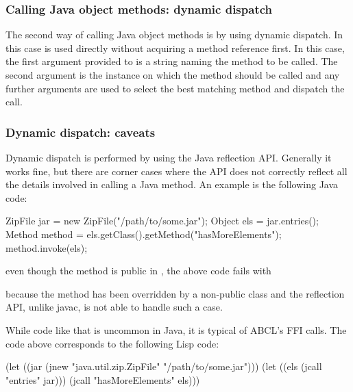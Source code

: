 \documentclass[10pt]{book}
\begin{document}
\subsubsection{Calling Java object methods: dynamic dispatch}

The second way of calling Java object methods is by using dynamic dispatch.
In this case  is used directly without acquiring a method
reference first. In this case, the first argument provided to 
is a string naming the method to be called. The second argument is the instance
on which the method should be called and any further arguments are used to
select the best matching method and dispatch the call.

\subsubsection{Dynamic dispatch: caveats}

Dynamic dispatch is performed by using the Java reflection API. Generally
it works fine, but there are corner cases where the API does not correctly
reflect all the details involved in calling a Java method. An example is
the following Java code:

\begin{listing-java}
ZipFile jar = new ZipFile("/path/to/some.jar");
Object els = jar.entries();
Method method = els.getClass().getMethod("hasMoreElements");
method.invoke(els);
\end{listing-java}

even though the method  is public in ,
the above code fails with


because the method has been overridden by a non-public class and the
reflection API, unlike javac, is not able to handle such a case.

While code like that is uncommon in Java, it is typical of ABCL's FFI
calls. The code above corresponds to the following Lisp code:

\begin{listing-lisp}
(let ((jar (jnew "java.util.zip.ZipFile" "/path/to/some.jar")))
  (let ((els (jcall "entries" jar)))
    (jcall "hasMoreElements" els)))
\end{listing-lisp}
\end{document}
